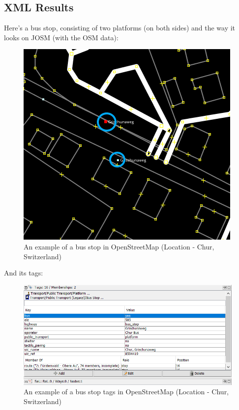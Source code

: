 \subsection{XML Results}
Here's a bus stop, consisting of two platforms (on both sides) and the way it looks on JOSM (with the OSM data):
\begin{figure}[H]
	\includegraphics[width=\linewidth]{./Images/Results/results_osm_example_1.png}
	\caption{An example of a bus stop in OpenStreetMap (Location - Chur, Switzerland)}
\end{figure}
And its tags:
\begin{figure}[H]
	\includegraphics[width=\linewidth]{./Images/Results/results_osm_example_2.png}
	\caption{An example of a bus stop tags in OpenStreetMap (Location - Chur, Switzerland)}
\end{figure}
